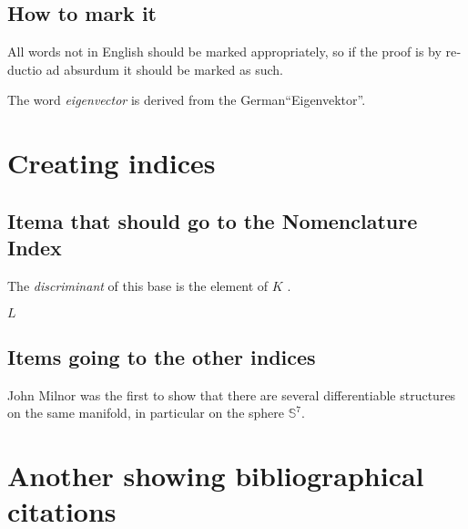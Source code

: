 \documentclass{book}
\begin{document}
\section{How to mark it}

All words not in English should be marked appropriately, so if the proof
is by \textlatin{reductio ad absurdum} it should be marked as such.

The word \emph{eigenvector} is derived from the German``\textgerman{Eigenvektor}''.

%

\chapter{Creating indices}

  \section{Itema that should go to the Nomenclature Index}

The \emph{discriminant} of this base is the
element of $K$ .

$L$

\section{Items going to the other indices}

John Milnor was the first to show that there are 
several differentiable structures on
the same manifold, in particular on the sphere
$\mathbb{S}^7$.


\chapter{Another showing bibliographical citations}
\end{document}
